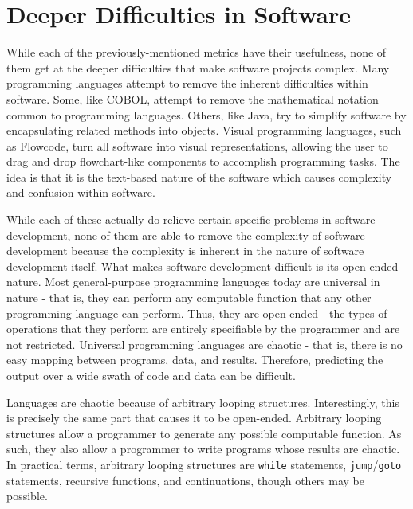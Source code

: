 \section{Deeper Difficulties in Software}

While each of the previously-mentioned metrics have their usefulness, none of them get at the deeper difficulties that make software projects complex.  Many programming languages attempt to remove the inherent difficulties within software.  Some, like COBOL, attempt to remove the mathematical notation common to programming languages.  Others, like Java, try to simplify software by encapsulating related methods into objects.  Visual programming languages, such as Flowcode, turn all software into visual representations, allowing the user to drag and drop flowchart-like components to accomplish programming tasks.  The idea is that it is the text-based nature of the software which causes complexity and confusion within software.

While each of these actually do relieve certain specific problems in software development, none of them are able to remove the complexity of software development because the complexity is inherent in the nature of software development itself.  What makes software development difficult is its open-ended nature.  Most general-purpose programming languages today are universal in nature - that is, they can perform any computable function that any other programming language can perform.  Thus, they are open-ended - the types of operations that they perform are entirely specifiable by the programmer and are not restricted.
Universal programming languages are chaotic - that is, there is no easy mapping between programs, data, and results.  Therefore, predicting the output over a wide swath of code and data can be difficult.  

Languages are chaotic because of arbitrary looping structures.  Interestingly, this is precisely the same part that causes it to be open-ended.  Arbitrary looping structures allow a programmer to generate any possible computable function.  As such, they also allow a programmer to write programs whose results are chaotic.  In practical terms, arbitrary looping structures are \verb+while+ statements, \verb+jump+/\verb+goto+ statements, recursive functions, and continuations, though others may be possible.

